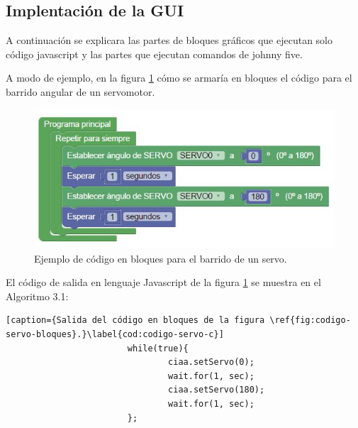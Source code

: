 \subsection{Implentación de la GUI}
\label{subsec:Implentación de la GUI}

A continuación se explicara las partes de bloques gráficos que ejecutan solo código javascript y las partes que ejecutan comandos de johnny five.

A modo de ejemplo, en la figura \ref{fig:codigo-servo-bloques} cómo se armaría en bloques el código para el barrido angular de un servomotor.

\begin{figure}[!htbp]
	\centering
	\includegraphics[width=12cm]{./Figures/ejemplo-servo.jpg}
	\caption{Ejemplo de código en bloques para el barrido de un servo.}
	\label{fig:codigo-servo-bloques}
\end{figure}

El código de salida en lenguaje Javascript de la figura \ref{fig:codigo-servo-bloques} se muestra 
en el Algoritmo 3.1:


\begin{lstlisting}[caption={Salida del código en bloques de la figura \ref{fig:codigo-servo-bloques}.}\label{cod:codigo-servo-c}] 
		                while(true){
			                	ciaa.setServo(0);
			                	wait.for(1, sec);
				                ciaa.setServo(180);
				                wait.for(1, sec);
		                };

\end{lstlisting}


